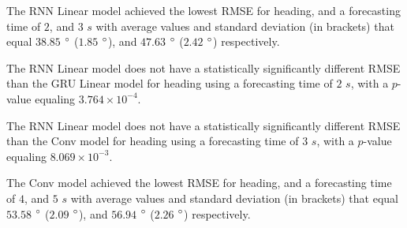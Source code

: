 \documentclass[preprint,12pt]{elsarticle}
\begin{document}
\begin{table}[!ht]
	\centering
	\caption{The average RMSE in $\degree$, with standard deviation in brackets, across $k$-fold validation datasets for the heading estimated on the $k$-fold testing datasets by different RNN models, and forecasting times.}
	\label{tab:best_direction_RMSE}
\end{table}

The RNN Linear model achieved the lowest RMSE for heading, and a forecasting time of $2$, and $3$ $s$ with average values and standard deviation (in brackets) that equal $38.85$ $\degree$ ($1.85$ $\degree$), and $47.63$ $\degree$ ($2.42$ $\degree$) respectively.

The RNN Linear model does not have a statistically significantly different RMSE than the GRU Linear model for heading using a forecasting time of $2$ $s$, with a $p$-value equaling $3.764 \times 10^{-4}$.

The RNN Linear model does not have a statistically significantly different RMSE than the Conv model for heading using a forecasting time of $3$ $s$, with a $p$-value equaling $8.069 \times 10^{-3}$.

The Conv model achieved the lowest RMSE for heading, and a forecasting time of $4$, and $5$ $s$ with average values and standard deviation (in brackets) that equal $53.58$ $\degree$ ($2.09$ $\degree$), and $56.94$ $\degree$ ($2.26$ $\degree$) respectively.
\end{document}
